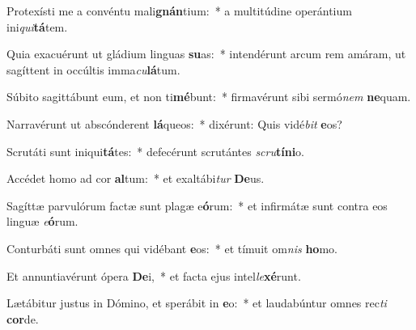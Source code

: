 \item Protexísti me a convéntu mali\textbf{gnán}tium:~* a multitúdine operántium ini\textit{qui}\textbf{tá}tem.
\item Quia exacuérunt ut gládium linguas \textbf{su}as:~* intendérunt arcum rem amáram, ut sagíttent in occúltis imma\textit{cu}\textbf{lá}tum.
\item Súbito sagittábunt eum, et non ti\textbf{mé}bunt:~* firmavérunt sibi sermó\textit{nem} \textbf{ne}quam.
\item Narravérunt ut abscónderent \textbf{lá}queos:~* dixérunt: Quis vidé\textit{bit} \textbf{e}os?
\item Scrutáti sunt iniqui\textbf{tá}tes:~* defecérunt scrutántes \textit{scru}\textbf{tí}\textbf{ni}o.
\item Accédet homo ad cor \textbf{al}tum:~* et exaltábi\textit{tur} \textbf{De}us.
\item Sagíttæ parvulórum factæ sunt plagæ e\textbf{ó}rum:~* et infirmátæ sunt contra eos linguæ \textit{e}\textbf{ó}rum.
\item Conturbáti sunt omnes qui vidébant \textbf{e}os:~* et tímuit om\textit{nis} \textbf{ho}mo.
\item Et annuntiavérunt ópera \textbf{De}i,~* et facta ejus intel\textit{le}\textbf{xé}runt.
\item Lætábitur justus in Dómino, et sperábit in \textbf{e}o:~* et laudabúntur omnes rec\textit{ti} \textbf{cor}de.
